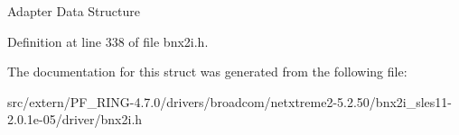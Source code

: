 Adapter Data Structure 

Definition at line 338 of file bnx2i.h.



The documentation for this struct was generated from the following file:\begin{DoxyCompactItemize}
\item 
src/extern/PF\_\-RING-\/4.7.0/drivers/broadcom/netxtreme2-\/5.2.50/bnx2i\_\-sles11-\/2.0.1e-\/05/driver/bnx2i.h\end{DoxyCompactItemize}
